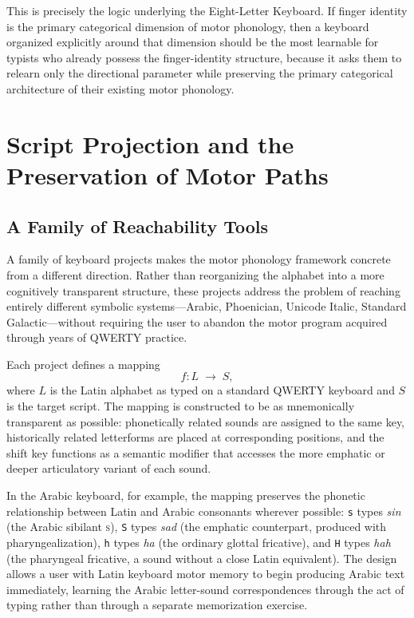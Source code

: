\documentclass[12pt,a4paper]{article}
\theoremstyle{plain}
\theoremstyle{definition}
\theoremstyle{remark}
\begin{document}
This is precisely the logic underlying the Eight-Letter Keyboard. If finger
identity is the primary categorical dimension of motor phonology, then a
keyboard organized explicitly around that dimension should be the most learnable
for typists who already possess the finger-identity structure, because it
asks them to relearn only the directional parameter while preserving the primary
categorical architecture of their existing motor phonology.

\section{Script Projection and the Preservation of Motor Paths}

\subsection{A Family of Reachability Tools}

A family of keyboard projects makes the motor phonology framework concrete from
a different direction. Rather than reorganizing the alphabet into a more
cognitively transparent structure, these projects address the problem of
reaching entirely different symbolic systems---Arabic, Phoenician, Unicode
Italic, Standard Galactic---without requiring the user to abandon the motor
program acquired through years of QWERTY practice.

Each project defines a mapping
\[
  f : L \;\to\; S,
\]
where $L$ is the Latin alphabet as typed on a standard QWERTY keyboard and $S$
is the target script. The mapping is constructed to be as mnemonically
transparent as possible: phonetically related sounds are assigned to the same
key, historically related letterforms are placed at corresponding positions, and
the shift key functions as a semantic modifier that accesses the more emphatic
or deeper articulatory variant of each sound.

In the Arabic keyboard, for example, the mapping preserves the phonetic
relationship between Latin and Arabic consonants wherever possible:
\texttt{s} types \textit{sin} (the Arabic sibilant \textsc{s}), \texttt{S}
types \textit{sad} (the emphatic counterpart, produced with pharyngealization),
\texttt{h} types \textit{ha} (the ordinary glottal fricative), and \texttt{H}
types \textit{hah} (the pharyngeal fricative, a sound without a close Latin
equivalent). The design allows a user
with Latin keyboard motor memory to begin producing Arabic text immediately,
learning the Arabic letter-sound correspondences through the act of typing
rather than through a separate memorization exercise.
\end{document}

